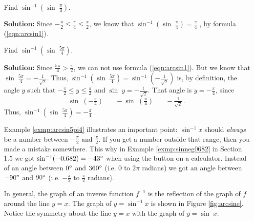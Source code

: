 \begin{exmp}
 Find $\sin^{-1} \left(\sin\;\frac{\pi}{4}\right)$.\vspace{1mm}
 \par\noindent\textbf{Solution:} Since $-\frac{\pi}{2} \le \frac{\pi}{4} \le \frac{\pi}{2}$, we know
 that $\sin^{-1} \left(\sin\;\frac{\pi}{4}\right) = \boxed{\frac{\pi}{4}}\;$, by formula
 (\ref{eqn:arcsin1}).
\end{exmp}
\begin{exmp}\label{exmp:arcsin5pi4}
 Find $\sin^{-1} \left(\sin\;\frac{5\pi}{4}\right)$.\vspace{1mm}
 \par\noindent\textbf{Solution:} Since $\frac{5\pi}{4} > \frac{\pi}{2}$, we can not use formula
 (\ref{eqn:arcsin1}). But we know that $\sin\;\frac{5\pi}{4} = -\frac{1}{\sqrt{2}}$. Thus,
 $\sin^{-1} \left(\sin\;\frac{5\pi}{4}\right) = \sin^{-1} \left( -\frac{1}{\sqrt{2}} \right)$ is, by
 definition, the angle $y$ such that $-\frac{\pi}{2} \le y \le \frac{\pi}{2}$ and $\sin\;y =
 -\frac{1}{\sqrt{2}}$. That angle is $y=-\frac{\pi}{4}$, since
 \begin{displaymath}
  \sin\;\left( -\tfrac{\pi}{4} \right) ~=~ -\sin\;\left( \tfrac{\pi}{4} \right) ~=~
  -\tfrac{1}{\sqrt{2}} ~.
 \end{displaymath}
 Thus, $\sin^{-1} \left(\sin\;\frac{5\pi}{4}\right) = \boxed{-\tfrac{\pi}{4}}\;$.
\end{exmp}
\divider
\newpage
Example \ref{exmp:arcsin5pi4} illustrates an important point: $\sin^{-1} x$ should \emph{always}
be a number between $-\frac{\pi}{2}$ and $\frac{\pi}{2}$. If you get a number outside that range,
then you made a mistake somewhere. This why in Example \ref{exmp:sinneg0682} in Section 1.5 we got
$\sin^{-1}(-0.682) = -43^\circ$ when using the
{\setlength\fboxsep{1pt}} button on a calculator. Instead of
an angle between $0^\circ$ and $360^\circ$ (i.e. $0$ to $2\pi$ radians) we got an angle
between $-90^\circ$ and $90^\circ$ (i.e. $-\frac{\pi}{2}$ to $\frac{\pi}{2}$ radians).

In general, the graph of an inverse function $f^{-1}$ is the reflection of the graph of $f$ around
the line $y=x$. The graph of $y=\sin^{-1} x$ is shown in Figure \ref{fig:arcsine}. Notice the
symmetry about the line $y=x$ with the graph of $y=\sin\;x$.

